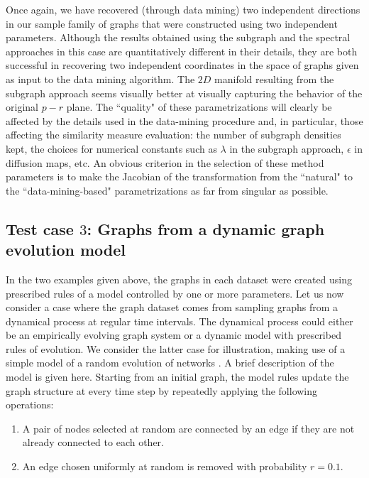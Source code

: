 Once again, we have recovered (through data mining) two independent
directions in our sample family of graphs that were constructed using
two independent parameters.
% 
Although the results obtained using the subgraph and the spectral
approaches in this case are quantitatively different in their details,
they are both successful in recovering two independent coordinates in
the space of graphs given as input to the data mining algorithm.
% 
The $2D$ manifold resulting from the subgraph approach seems visually
better at visually capturing the behavior of the original $p-r$ plane.
% 
The ``quality" of these parametrizations will clearly be affected by
the details used in the data-mining procedure and, in particular,
those affecting the similarity measure evaluation: the number of
subgraph densities kept, the choices for numerical constants such as
$\lambda$ in the subgraph approach, $\epsilon$ in diffusion maps, etc.
% 
An obvious criterion in the selection of these method parameters is to
make the Jacobian of the transformation from the ``natural" to the
``data-mining-based" parametrizations as far from singular as
possible.


\subsection{\label{ss:dm} Test case $3$: Graphs from a dynamic graph
  evolution model}

In the two examples given above, the graphs in each dataset were
created using prescribed rules of a model controlled by one or more
parameters.
% 
Let us now consider a case where the graph dataset comes from sampling
graphs from a dynamical process at regular time intervals.
% 
The dynamical process could either be an empirically evolving graph
system or a dynamic model with prescribed rules of evolution.
% 
We consider the latter case for illustration, making use of a simple
model of a random evolution of networks \cite{bold2014equation}.
% 
A brief description of the model is given here.
% 
Starting from an initial graph, the model rules update the graph
structure at every time step by repeatedly applying the following
operations:

\begin{enumerate}
\item A pair of nodes selected at random are connected by an edge if
  they are not already connected to each other.
\item An edge chosen uniformly at random is removed with probability
  $r=0.1$.
\end{enumerate}

